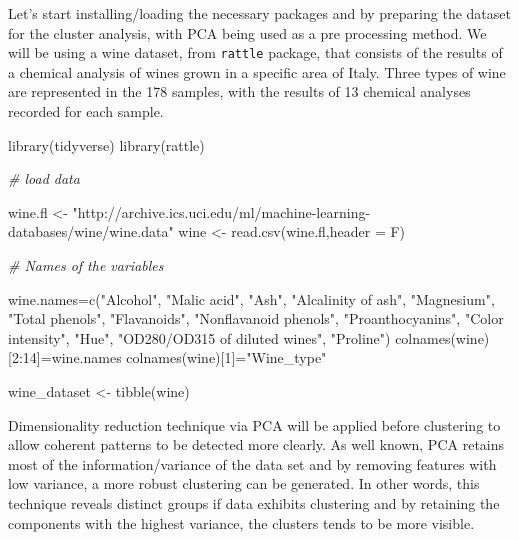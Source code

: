 \documentclass[
]{book}
\newenvironment{Shaded}{\begin{snugshade}}{\end{snugshade}}
\newcommand{\AttributeTok}[1]{\textcolor[rgb]{0.77,0.63,0.00}{#1}}
\newcommand{\CommentTok}[1]{\textcolor[rgb]{0.56,0.35,0.01}{\textit{#1}}}
\newcommand{\DecValTok}[1]{\textcolor[rgb]{0.00,0.00,0.81}{#1}}
\newcommand{\FunctionTok}[1]{\textcolor[rgb]{0.00,0.00,0.00}{#1}}
\newcommand{\NormalTok}[1]{#1}
\newcommand{\OtherTok}[1]{\textcolor[rgb]{0.56,0.35,0.01}{#1}}
\newcommand{\SpecialCharTok}[1]{\textcolor[rgb]{0.00,0.00,0.00}{#1}}
\newcommand{\StringTok}[1]{\textcolor[rgb]{0.31,0.60,0.02}{#1}}
\begin{document}
Let's start installing/loading the necessary packages and by preparing the dataset for the cluster analysis, with PCA being used as a pre processing method. We will be using a wine dataset, from \texttt{rattle} package, that consists of the results of a chemical analysis of wines grown in a specific area of Italy. Three types of wine are represented in the 178 samples, with the results of 13 chemical analyses recorded for each sample.

\begin{Shaded}
\begin{Highlighting}[]
\FunctionTok{library}\NormalTok{(tidyverse)}
\FunctionTok{library}\NormalTok{(rattle)}

\CommentTok{\# load data}

\NormalTok{wine.fl }\OtherTok{\textless{}{-}} \StringTok{"http://archive.ics.uci.edu/ml/machine{-}learning{-}databases/wine/wine.data"}
\NormalTok{wine }\OtherTok{\textless{}{-}} \FunctionTok{read.csv}\NormalTok{(wine.fl,}\AttributeTok{header =}\NormalTok{ F)}

\CommentTok{\# Names of the variables}

\NormalTok{wine.names}\OtherTok{=}\FunctionTok{c}\NormalTok{(}\StringTok{"Alcohol"}\NormalTok{, }\StringTok{"Malic acid"}\NormalTok{, }\StringTok{"Ash"}\NormalTok{, }\StringTok{"Alcalinity of ash"}\NormalTok{, }\StringTok{"Magnesium"}\NormalTok{,}
             \StringTok{"Total phenols"}\NormalTok{, }\StringTok{"Flavanoids"}\NormalTok{, }\StringTok{"Nonflavanoid phenols"}\NormalTok{, }\StringTok{"Proanthocyanins"}\NormalTok{,}
             \StringTok{"Color intensity"}\NormalTok{, }\StringTok{"Hue"}\NormalTok{, }\StringTok{"OD280/OD315 of diluted wines"}\NormalTok{, }\StringTok{"Proline"}\NormalTok{)}
\FunctionTok{colnames}\NormalTok{(wine)[}\DecValTok{2}\SpecialCharTok{:}\DecValTok{14}\NormalTok{]}\OtherTok{=}\NormalTok{wine.names}
\FunctionTok{colnames}\NormalTok{(wine)[}\DecValTok{1}\NormalTok{]}\OtherTok{=}\StringTok{"Wine\_type"}

\NormalTok{wine\_dataset }\OtherTok{\textless{}{-}} \FunctionTok{tibble}\NormalTok{(wine)}
\end{Highlighting}
\end{Shaded}

Dimensionality reduction technique via PCA will be applied before clustering to allow coherent patterns to be detected more clearly. As well known, PCA retains most of the information/variance of the data set and by removing features with low variance, a more robust clustering can be generated. In other words, this technique reveals distinct groups if data exhibits clustering and by retaining the components with the highest variance, the clusters tends to be more visible.
\end{document}
